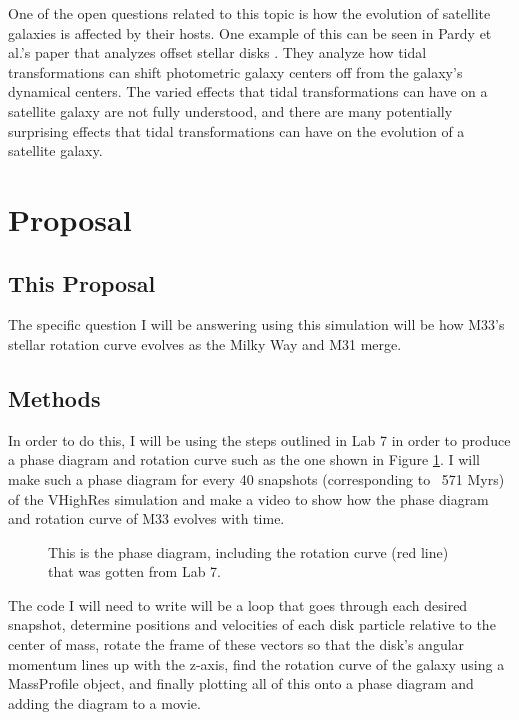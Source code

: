 \documentclass[trackchanges]{aastex7}
\begin{document}
One of the open questions related to this topic is how the evolution of satellite galaxies is affected by their hosts. One example of this can be seen in Pardy et al.'s paper that analyzes offset stellar disks \citep{Pardy2016}. They analyze how tidal transformations can shift photometric galaxy centers off from the galaxy's dynamical centers. The varied effects that tidal transformations can have on a satellite galaxy are not fully understood, and there are many potentially surprising effects that tidal transformations can have on the evolution of a satellite galaxy.

\section{Proposal} \label{sec:style}

\subsection{This Proposal}

The specific question I will be answering using this simulation will be how M33's stellar rotation curve evolves as the Milky Way and M31 merge.

\subsection{Methods}

In order to do this, I will be using the steps outlined in Lab 7 in order to produce a phase diagram and rotation curve such as the one shown in Figure \ref{fig:Lab7}. I will make such a phase diagram for every 40 snapshots (corresponding to ~571 Myrs) of the VHighRes simulation and make a video to show how the phase diagram and rotation curve of M33 evolves with time. 

\begin{figure}[ht!]
\caption{ This is the phase diagram, including the rotation curve (red line) that was gotten from Lab 7.
\label{fig:Lab7}}
\end{figure}

The code I will need to write will be a loop that goes through each desired snapshot, determine positions and velocities of each disk particle relative to the center of mass, rotate the frame of these vectors so that the disk's angular momentum lines up with the z-axis, find the rotation curve of the galaxy using a MassProfile object, and finally plotting all of this onto a phase diagram and adding the diagram to a movie.
\end{document}
